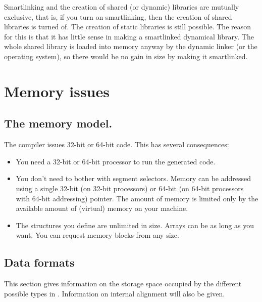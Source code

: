 Smartlinking and the creation of shared (or dynamic) libraries are mutually
exclusive, that is, if you turn on smartlinking, then the creation of shared
libraries is turned of. The creation of static libraries is still possible.
The reason for this is that it has little sense in making a smartlinked
dynamical library. The whole shared library is loaded into memory anyway by
the dynamic linker (or the operating system), so there would be no gain in size by
making it smartlinked.




\chapter{Memory issues}
\label{ch:Memory}

\section{The memory model.}
\label{se:ThirtytwoBit}
The \fpc compiler issues 32-bit or 64-bit code.
This has several consequences:
\begin{itemize}
\item You need a 32-bit or 64-bit processor to run the generated code. 
\item You don't need to bother with segment selectors. Memory can be
addressed using a single 32-bit (on 32-bit processors) or 64-bit (on
64-bit processors with 64-bit addressing) pointer.
The amount of memory is limited only by the available amount of (virtual)
memory on your machine.
\item The structures you define are unlimited in size. Arrays can be as long
as you want. You can request memory blocks from any size.
\end{itemize}

\section{Data formats}
\label{se:Dataformats}

This section gives information on the storage space occupied by
the different possible types in \fpc. Information on internal
alignment will also be given.

